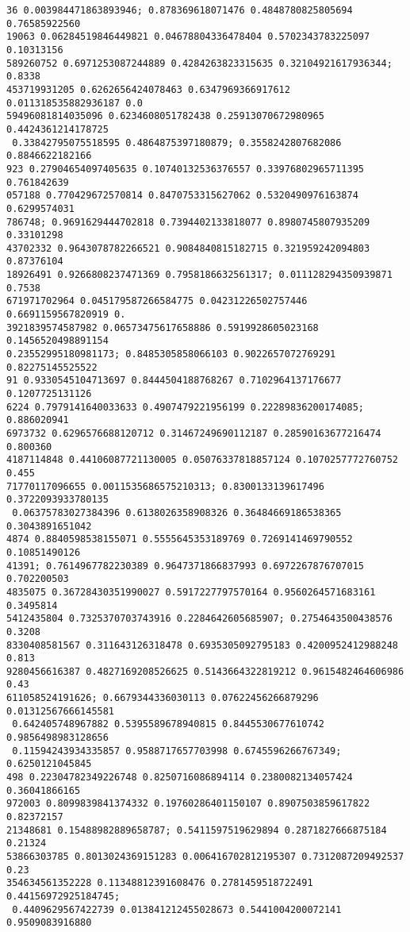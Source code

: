\documentclass[12pt,a4paper]{article}
\begin{document}
\begin{lstlisting}
36 0.003984471863893946; 0.878369618071476 0.4848780825805694 0.76585922560
19063 0.06284519846449821 0.04678804336478404 0.5702343783225097 0.10313156
589260752 0.6971253087244889 0.4284263823315635 0.32104921617936344; 0.8338
453719931205 0.6262656424078463 0.6347969366917612 0.011318535882936187 0.0
59496081814035096 0.6234608051782438 0.25913070672980965 0.4424361214178725
 0.33842795075518595 0.4864875397180879; 0.3558242807682086 0.8846622182166
923 0.27904654097405635 0.10740132536376557 0.33976802965711395 0.761842639
057188 0.770429672570814 0.8470753315627062 0.5320490976163874 0.6299574031
786748; 0.9691629444702818 0.7394402133818077 0.8980745807935209 0.33101298
43702332 0.9643078782266521 0.9084840815182715 0.321959242094803 0.87376104
18926491 0.9266808237471369 0.7958186632561317; 0.011128294350939871 0.7538
671971702964 0.045179587266584775 0.04231226502757446 0.6691159567820919 0.
3921839574587982 0.06573475617658886 0.5919928605023168 0.1456520498891154 
0.23552995180981173; 0.8485305858066103 0.9022657072769291 0.82275145525522
91 0.9330545104713697 0.8444504188768267 0.7102964137176677 0.1207725131126
6224 0.7979141640033633 0.4907479221956199 0.22289836200174085; 0.886020941
6973732 0.6296576688120712 0.31467249690112187 0.28590163677216474 0.800360
4187114848 0.44106087721130005 0.05076337818857124 0.1070257772760752 0.455
71770117096655 0.0011535686575210313; 0.8300133139617496 0.3722093933780135
 0.06375783027384396 0.6138026358908326 0.36484669186538365 0.3043891651042
4874 0.8840598538155071 0.5555645353189769 0.7269141469790552 0.10851490126
41391; 0.7614967782230389 0.9647371866837993 0.6972267876707015 0.702200503
4835075 0.36728430351990027 0.5917227797570164 0.9560264571683161 0.3495814
5412435804 0.7325370703743916 0.2284642605685907; 0.2754643500438576 0.3208
8330408581567 0.311643126318478 0.6935305092795183 0.4200952412988248 0.813
9280456616387 0.4827169208526625 0.5143664322819212 0.9615482464606986 0.43
611058524191626; 0.6679344336030113 0.07622456266879296 0.01312567666145581
 0.642405748967882 0.5395589678940815 0.8445530677610742 0.9856498983128656
 0.11594243934335857 0.9588717657703998 0.6745596266767349; 0.6250121045845
498 0.22304782349226748 0.8250716086894114 0.2380082134057424 0.36041866165
972003 0.8099839841374332 0.19760286401150107 0.8907503859617822 0.82372157
21348681 0.15488982889658787; 0.5411597519629894 0.2871827666875184 0.21324
53866303785 0.8013024369151283 0.006416702812195307 0.7312087209492537 0.23
354634561352228 0.11348812391608476 0.2781459518722491 0.44156972925184745;
 0.4409629567422739 0.013841212455028673 0.5441004200072141 0.9509083916880

\end{lstlisting}
\end{document}
